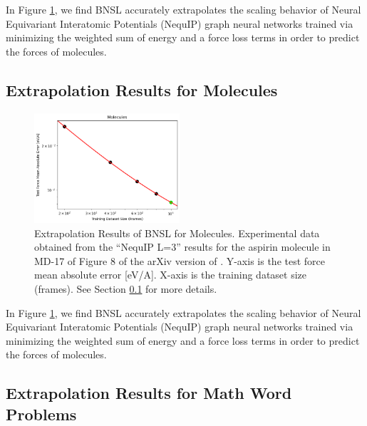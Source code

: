 \documentclass{article} %
\begin{document}
In Figure \ref{fig:molecules}, we find BNSL accurately extrapolates the scaling behavior of Neural Equivariant Interatomic Potentials (NequIP) graph neural networks \citep{Batzner_2022} trained via minimizing the weighted sum of energy and a force loss terms in order to predict the forces of molecules. 
\fi

\subsection{Extrapolation Results for Molecules}
\label{section:molecules}

\begin{figure}[htbp]
    \centering
\includegraphics[width=0.48\textwidth]{figures/molecules/molecules.png}
    \caption{
Extrapolation Results of BNSL for Molecules. Experimental data obtained from the ``NequIP L=3'' results for the aspirin molecule in MD-17 of Figure 8 of the arXiv version of \cite{Batzner_2022}. Y-axis is the test force mean absolute error [eV/A]. X-axis is the training dataset size (frames). See Section \ref{section:molecules} for more details.
    }
    \label{fig:molecules}
\end{figure}

In Figure \ref{fig:molecules}, we find BNSL accurately extrapolates the scaling behavior of Neural Equivariant Interatomic Potentials (NequIP) graph neural networks \citep{Batzner_2022} trained via minimizing the weighted sum of energy and a force loss terms in order to predict the forces of molecules. 


\subsection{Extrapolation Results for Math Word Problems}
\label{section:math_word_problems}
\end{document}
